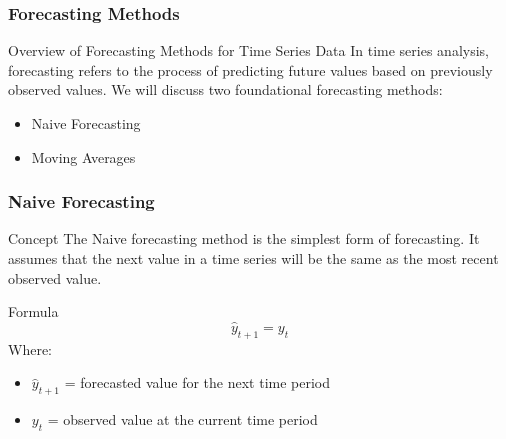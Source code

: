 \documentclass[aspectratio=169]{beamer}
\begin{document}
\begin{frame}[fragile]
    \frametitle{Forecasting Methods}
    \begin{block}{Overview of Forecasting Methods for Time Series Data}
        In time series analysis, forecasting refers to the process of predicting future values based on previously observed values. 
        We will discuss two foundational forecasting methods:
        \begin{itemize}
            \item Naive Forecasting
            \item Moving Averages
        \end{itemize}
    \end{block}
\end{frame}

\begin{frame}[fragile]
    \frametitle{Naive Forecasting}
    \begin{block}{Concept}
        The Naive forecasting method is the simplest form of forecasting. It assumes that the next value in a time series will be the same as the most recent observed value.
    \end{block}
    
    \begin{block}{Formula}
        \begin{equation}
        \hat{y}_{t+1} = y_t 
        \end{equation}
        Where:
        \begin{itemize}
            \item \( \hat{y}_{t+1} \) = forecasted value for the next time period
            \item \( y_t \) = observed value at the current time period
        \end{itemize}
    \end{block}
\end{frame}
\end{document}
